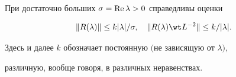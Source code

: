  


 


\begin{lem} 


При достаточно больших $\sigma=\operatorname{Re}\lambda>0$ справедливы оценки 


\begin{equation} 


\|R(\lambda)\|\le k|\lambda|/\sigma,\quad


\|R(\lambda)\wt L{}^{-2}\|\le k/|\lambda|.


\end{equation} 


Здесь и далее $k$ обозначает постоянную $($не зависящую от $\lambda)$,


различную, вообще говоря, в различных неравенствах. 


\end{lem} 


 


 


